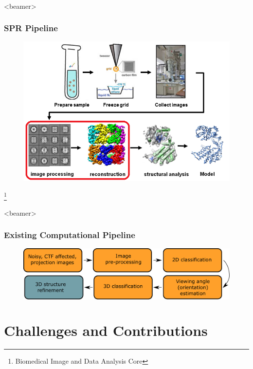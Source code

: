 \documentclass{beamer}
\newcommand\blfootnote[1]{%
  \begingroup
  \renewcommand\thefootnote{}\footnote{#1}%
  \addtocounter{footnote}{-1}%
  \endgroup
}
\begin{document}
\begin{frame}<beamer>
\frametitle{SPR Pipeline}
\begin{figure}[h]
\centering
{\includegraphics[scale=0.55]{figures/pipeline_pics.png}}
\label{fig:rawims}
\end{figure}
\blfootnote{Biomedical Image and Data Analysis Core}
\end{frame}

\begin{frame}<beamer>
\frametitle{Existing Computational Pipeline}
\begin{figure}[h]
\centering
{\includegraphics[scale=0.4]{figures/cryoem_pipeline.pdf}}\\
\label{fig:rawims}
\end{figure}
\end{frame}

\section{Challenges and Contributions}
\end{document}
